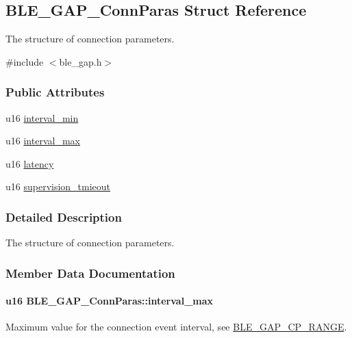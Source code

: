 \hypertarget{struct_b_l_e___g_a_p___conn_paras}{}\subsection{B\+L\+E\+\_\+\+G\+A\+P\+\_\+\+Conn\+Paras Struct Reference}
\label{struct_b_l_e___g_a_p___conn_paras}


The structure of connection parameters.  




{\ttfamily \#include $<$ble\+\_\+gap.\+h$>$}

\subsubsection*{Public Attributes}
\begin{DoxyCompactItemize}
\item 
u16 \hyperlink{struct_b_l_e___g_a_p___conn_paras_a4f3028c0d97368a30baaf8d2362e00ae}{interval\+\_\+min}
\item 
u16 \hyperlink{struct_b_l_e___g_a_p___conn_paras_a80d178980271a69ead8eb5a2c7e8540e}{interval\+\_\+max}
\item 
u16 \hyperlink{struct_b_l_e___g_a_p___conn_paras_a3320da60ea7289b4022e1ae51b948803}{latency}
\item 
u16 \hyperlink{struct_b_l_e___g_a_p___conn_paras_aba5725cf2f72208547b195d263ea2d4c}{supervision\+\_\+tmieout}
\end{DoxyCompactItemize}


\subsubsection{Detailed Description}
The structure of connection parameters. 

\subsubsection{Member Data Documentation}
\paragraph[{\texorpdfstring{interval\+\_\+max}{interval_max}}]{\setlength{\rightskip}{0pt plus 5cm}u16 B\+L\+E\+\_\+\+G\+A\+P\+\_\+\+Conn\+Paras\+::interval\+\_\+max}\hypertarget{struct_b_l_e___g_a_p___conn_paras_a80d178980271a69ead8eb5a2c7e8540e}{}\label{struct_b_l_e___g_a_p___conn_paras_a80d178980271a69ead8eb5a2c7e8540e}
Maximum value for the connection event interval, see \hyperlink{group___b_l_e___g_a_p___c_p___r_a_n_g_e}{B\+L\+E\+\_\+\+G\+A\+P\+\_\+\+C\+P\+\_\+\+R\+A\+N\+GE}. 
